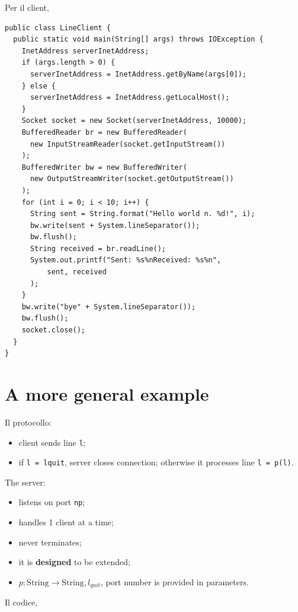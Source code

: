 \documentclass[\fontsizeclass,twocolumn]{\classname}
\theoremstyle{definition}
\theoremstyle{definition}
\begin{document}
Per il client,

\begin{lstlisting}
public class LineClient {
  public static void main(String[] args) throws IOException {
    InetAddress serverInetAddress;
    if (args.length > 0) {
      serverInetAddress = InetAddress.getByName(args[0]);
    } else {
      serverInetAddress = InetAddress.getLocalHost();
    }
    Socket socket = new Socket(serverInetAddress, 10000);
    BufferedReader br = new BufferedReader(
      new InputStreamReader(socket.getInputStream())
    );
    BufferedWriter bw = new BufferedWriter(
      new OutputStreamWriter(socket.getOutputStream())
    );
    for (int i = 0; i < 10; i++) {
      String sent = String.format("Hello world n. %d!", i);
      bw.write(sent + System.lineSeparator());
      bw.flush();
      String received = br.readLine();
      System.out.printf("Sent: %s%nReceived: %s%n",
          sent, received
      );
    }
    bw.write("bye" + System.lineSeparator());
    bw.flush();
    socket.close();
  }
}
\end{lstlisting}

\section{A more general example}

Il protocollo:
\begin{itemize}
    \item client sends line \texttt{l};
    \item if \texttt{l = lquit}, server closes connection; otherwise it
        processes line \texttt{l = p(l)}.
\end{itemize}

The server:
\begin{itemize}
    \item listens on port \texttt{np};
    \item handles 1 client at a time;
    \item never terminates;
    \item it is \textbf{designed} to be extended;
    \item $p : \mathrm{ String } \rightarrow \mathrm{ String }, l_{quit}$, port
        number is provided in parameters.
\end{itemize}


Il codice,
\end{document}

